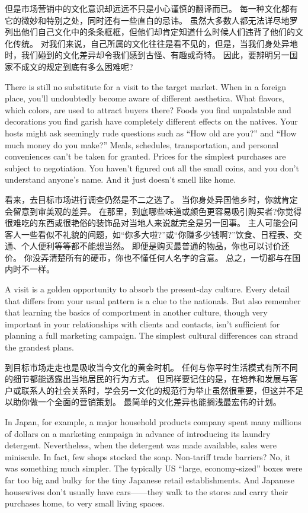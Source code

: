 \documentclass[cs4size, a4paper, 12pt]{article}
\newcounter{numpar}
\newcommand*{\newpar}{\numpar{}}
\begin{document}
	但是市场营销中的文化意识却远远不只是小心谨慎的翻译而已。 每一种文化都有它的微妙和特别之处，同时还有一些直白的忌讳。 虽然大多数人都无法详尽地罗列出他们自己文化中的条条框框，但他们却肯定知道什么时候人们违背了他们的文化传统。 对我们来说，自己所属的文化往往是看不见的，但是，当我们身处异地时，我们碰到的文化差异却令我们感到古怪、有趣或奇特。 因此，要辨明另一国家不成文的规定到底有多么困难呢? 
	
	\newpar There is still no substitute for a visit to the target market. When in a foreign place, you’ll undoubtedly become aware of different aesthetica. What flavors, which colors, are used to attract buyers there? Foods you find unpalatable and decorations you find  garish have completely different effects on the natives. Your hosts might ask seemingly  rude  questions such as ``How old are you?'' and ``How much money do you make?'' Meals, schedules, transportation, and personal conveniences can't be taken for granted. Prices for the simplest purchases are subject to negotiation. You haven't figured out all the small coins, and you don't understand anyone's name. And it just doesn't smell like home.
	
	看来，去目标市场进行调查仍然是不二之选了。 当你身处异国他乡时，你就肯定会留意到审美观的差异。 在那里，到底哪些味道或颜色更容易吸引购买者?你觉得很难吃的东西或很艳俗的装饰品对当地人来说就完全是另一回事。 主人可能会问客人一些看似不礼貌的间题，如``你多大啦?''或``你赚多少钱啊?''饮食、日程表、交通、个人便利等等都不能想当然。 即便是购买最普通的物品，你也可以讨价还价。 你没弄清楚所有的硬币，你也不懂任何人名字的含意。 总之，一切都与在国内时不一样。  
	
	\newpar A visit is a golden opportunity to absorb the present-day culture. Every detail that differs  from your usual pattern is a clue to the nationals. But also remember that learning the basics of comportment in another culture, though very important in your relationships with  clients and contacts, isn't sufficient for planning a full marketing campaign. The simplest cultural differences  can strand the grandest plans.
	
	到目标市场走走也是吸收当今文化的黄金时机。 任何与你平时生活模式有所不同的细节都能透露出当地居民的行为方式。 但同样要记住的是，在培养和发展与客户或联系人的社会关系时，学会另一文化的规范行为举止虽然很重要，但这并不足以助你做一个全面的营销策划。 最简单的文化差异也能搁浅最宏伟的计划。 
	
	\newpar In Japan, for example, a major household products company spent many millions of dollars on a marketing campaign in advance of introducing its laundry detergent. Nevertheless, when the detergent was made available, sales were miniscule. In fact, few shops stocked the soap. Non-tariff trade barriers?  No, it was something much simpler. The typically US ``large, economy-sized'' boxes  were far too big and bulky for the tiny Japanese retail establishments. And Japanese housewives don't usually have cars——they walk to the stores and carry their purchases home, to very small living spaces.
	
\end{document}
